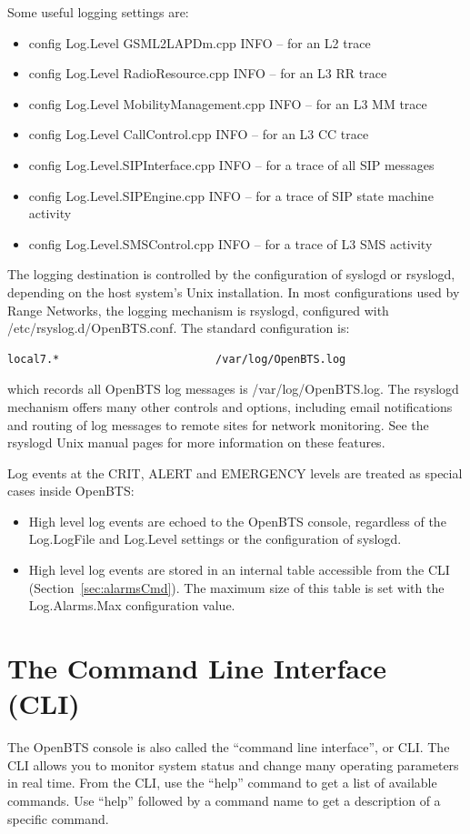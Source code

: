 \documentclass[11pt,openany]{book}
\begin{document}
Some useful logging settings are:
\begin{itemize}
	\item config Log.Level GSML2LAPDm.cpp INFO -- for an L2 trace
	\item config Log.Level RadioResource.cpp INFO -- for an L3 RR trace
	\item config Log.Level MobilityManagement.cpp INFO -- for an L3 MM trace
	\item config Log.Level CallControl.cpp INFO -- for an L3 CC trace
	\item config Log.Level.SIPInterface.cpp INFO -- for a trace of all SIP messages
	\item config Log.Level.SIPEngine.cpp INFO -- for a trace of SIP state machine activity
	\item config Log.Level.SMSControl.cpp INFO -- for a trace of L3 SMS activity
\end{itemize}

The logging destination is controlled by the configuration of syslogd or rsyslogd, depending on the host system's Unix installation.  In most configurations used by Range Networks, the logging mechanism is rsyslogd, configured with /etc/rsyslog.d/OpenBTS.conf.  The standard configuration is:
\begin{verbatim}
local7.*                        /var/log/OpenBTS.log
\end{verbatim}
which records all OpenBTS log messages is /var/log/OpenBTS.log.
The rsyslogd mechanism offers many other controls and options, including email notifications and routing of log messages to remote sites for network monitoring.  See the rsyslogd Unix manual pages for more information on these features. 

Log events at the CRIT, ALERT and EMERGENCY levels are treated as special cases inside OpenBTS:
\begin{itemize}
	\item High level log events are echoed to the OpenBTS console, regardless of the Log.LogFile and Log.Level settings or the configuration of syslogd.
	\item High level log events are stored in an internal table accessible from the CLI (Section~\ref{sec:alarmsCmd}). The maximum size of this table is set with the Log.Alarms.Max configuration value.
\end{itemize}


\section{The Command Line Interface (CLI)}
\label{sec:CLI}
The OpenBTS console is also called the ``command line interface'', or CLI.
The CLI allows you to monitor system status and change many operating parameters in real time.
From the CLI, use the ``help'' command to get a list of available commands.
Use ``help'' followed by a command name to get a description of a specific command.
\end{document}
